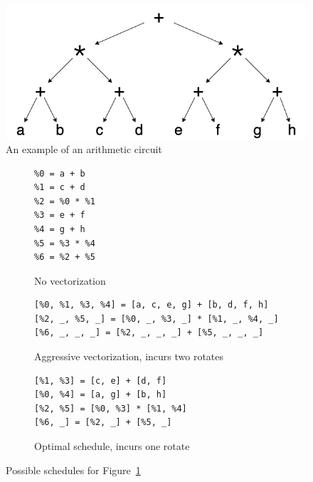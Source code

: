 \begin{figure}
    \includegraphics[width=0.6\linewidth]{figures/compilation_overview/coyote_running_example.drawio.png}
    \caption{An example of an arithmetic circuit}\label{fig:example-circuit}
\end{figure}


\begin{figure}
\small
    \begin{subfigure}{0.2\columnwidth}
        \begin{verbatim}
%0 = a + b
%1 = c + d
%2 = %0 * %1
%3 = e + f
%4 = g + h
%5 = %3 * %4
%6 = %2 + %5
        \end{verbatim}
        \vspace{-1em}
        \caption{No vectorization}\label{fig:no-vectorization}
    \end{subfigure}
    \begin{subfigure}{0.6\columnwidth}
        \begin{verbatim}
[%0, %1, %3, %4] = [a, c, e, g] + [b, d, f, h]
[%2, _, %5, _] = [%0, _, %3, _] * [%1, _, %4, _]
[%6, _, _, _] = [%2, _, _, _] + [%5, _, _, _]
        \end{verbatim}
        \vspace{-1em}        
        \caption{Aggressive vectorization, incurs two rotates}\label{fig:aggressive-vectorization}
    \end{subfigure}
    \begin{subfigure}{0.4\columnwidth}
        \begin{verbatim}
[%1, %3] = [c, e] + [d, f]
[%0, %4] = [a, g] + [b, h]
[%2, %5] = [%0, %3] * [%1, %4]
[%6, _] = [%2, _] + [%5, _]
        \end{verbatim}
        \vspace{-1em}        
        \caption{Optimal schedule, incurs one rotate}\label{fig:optimal-schedule}
    \end{subfigure}
    \caption{Possible schedules for Figure~\ref{fig:example-circuit}}
\end{figure}

